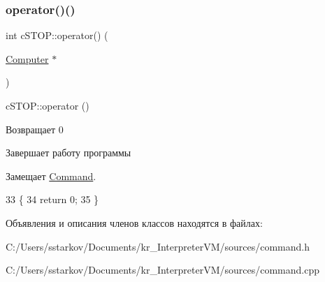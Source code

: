 \subsubsection{\texorpdfstring{operator()()}{operator()()}}
{\footnotesize\ttfamily int c\+S\+T\+O\+P\+::operator() (\begin{DoxyParamCaption}\item[{\hyperlink{class_computer}{Computer} $\ast$}]{ }\end{DoxyParamCaption})\hspace{0.3cm}{\ttfamily [virtual]}}



c\+S\+T\+O\+P\+::operator () 

\begin{DoxyReturn}{Возвращает}
0
\end{DoxyReturn}
Завершает работу программы 

Замещает \hyperlink{class_command_a79939b66f3de892e91d7710844294716}{Command}.


\begin{DoxyCode}
33 \{
34     \textcolor{keywordflow}{return} 0;
35 \}
\end{DoxyCode}


Объявления и описания членов классов находятся в файлах\+:\begin{DoxyCompactItemize}
\item 
C\+:/\+Users/sstarkov/\+Documents/kr\+\_\+\+Interpreter\+V\+M/sources/command.\+h\item 
C\+:/\+Users/sstarkov/\+Documents/kr\+\_\+\+Interpreter\+V\+M/sources/command.\+cpp\end{DoxyCompactItemize}
